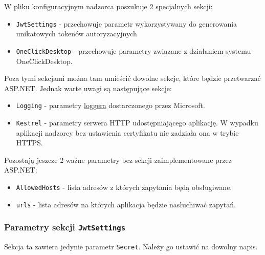 \documentclass[../opis-rozwiazania.tex]{subfiles}
\begin{document}
W pliku konfiguracyjnym nadzorca poszukuje 2 specjalnych sekcji:
\begin{itemize}
	\item \texttt{JwtSettings} - przechowuje parametr wykorzystywany do generowania unikatowych tokenów autoryzacyjnych
	\item \texttt{OneClickDesktop} - przechowuje parametry związane z działaniem systemu OneClickDesktop.
\end{itemize}
Poza tymi sekcjami można tam umieścić dowolne sekcje, które będzie przetwarzać ASP.NET.
Jednak warte uwagi są następujące sekcje:
\begin{itemize}
	\item \texttt{Logging} - parametry \href{https://www.nuget.org/packages/microsoft.extensions.logging}{loggera} dostarczonego przez Microsoft.
	\item \texttt{Kestrel} - parametry serwera HTTP udostępniającego aplikację. W wypadku aplikacji nadzorcy bez ustawienia certyfikatu nie zadziała ona w trybie HTTPS.
\end{itemize}
\noindent
Pozostają jeszcze 2 ważne parametry bez sekcji zaimplementowane przez ASP.NET:
\begin{itemize}
	\item \texttt{AllowedHosts} - lista adresów z których zapytania będą obsługiwane.
	\item \texttt{urls} - lista adresów na których aplikacja będzie nasłuchiwać zapytań.
\end{itemize}

\subsubsection{Parametry sekcji \texttt{JwtSettings}}
Sekcja ta zawiera jedynie parametr \texttt{Secret}. Należy go ustawić na dowolny napis.
\end{document}
